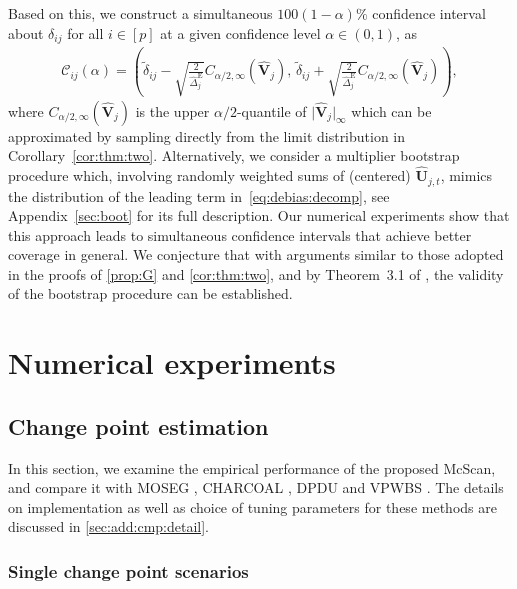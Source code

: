 \documentclass[11pt, a4paper]{article}
\newcommand{\mbf}{\mathbf}
\newcommand{\mc}{\mathcal}
\renewcommand{\l}{\left}
\renewcommand{\r}{\right}
\def\wh{\widehat}
\def\wc{\widetilde}
\newcommand{\tE}{\text{E}}
\theoremstyle{definition}
\theoremstyle{definition}
\theoremstyle{definition}
\theoremstyle{definition}
\theoremstyle{definition}
\theoremstyle{remark}
\theoremstyle{definition}
\theoremstyle{definition}
\theoremstyle{definition}
\begin{document}
Based on this, we construct a simultaneous $100(1 - \alpha)\%$ confidence interval about $\delta_{ij}$ for all $i \in [p]$ at a given confidence level $\alpha \in (0, 1)$, as
\begin{align}
\label{eq:ci}
\mc C_{ij}(\alpha) = 
\l( \wc{\delta}_{ij} - \sqrt{\frac{2}{\wh\Delta^{\tE}_j}} C_{\alpha/2, \infty}(\wh{\mbf V}_j),
\, 
\wc{\delta}_{ij} + \sqrt{\frac{2}{\wh\Delta^{\tE}_j}} C_{\alpha/2, \infty}(\wh{\mbf V}_j) \r),
\end{align}
where $C_{\alpha/2, \infty}(\wh{\mbf V}_j)$ is the upper $\alpha/2$-quantile of $\vert \wh{\mbf V}_j  \vert_\infty$ which can be approximated by sampling directly from the limit distribution in Corollary~\ref{cor:thm:two}.
Alternatively, we consider a multiplier bootstrap procedure which, involving randomly weighted sums of (centered) $\wh{\mbf U}_{j, t}$, mimics the distribution of the leading term in~\eqref{eq:debias:decomp}, see Appendix~\ref{sec:boot} for its full description.
Our numerical experiments show that this approach leads to simultaneous confidence intervals that achieve better coverage in general.
We conjecture that with arguments similar to those adopted in the proofs of \cref{prop:G} and \cref{cor:thm:two}, and by Theorem~3.1 of \cite{CCK23}, the validity of the bootstrap procedure can be established.

\section{Numerical experiments}
\label{sec:num}

\subsection{Change point estimation}
\label{sec:sim:cp}

In this section, we examine the empirical performance of the proposed McScan, and compare it with MOSEG \citep{cho2022high}, CHARCOAL \citep{gao2022sparse}, DPDU \citep{xu2022change} and VPWBS \citep{wang2021statistically}. The details on implementation as well as choice of tuning parameters for these methods are discussed in \cref{sec:add:cmp:detail}. 


\subsubsection{Single change point scenarios}
\label{sec:sim:single}
\end{document}
